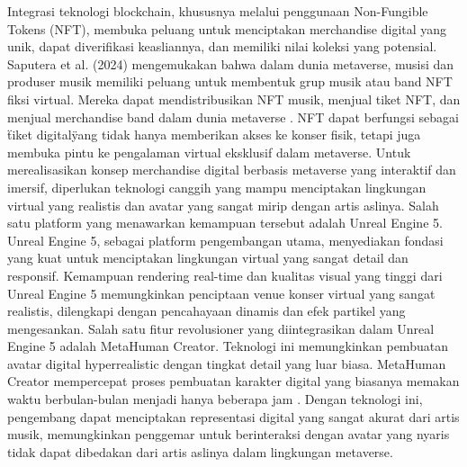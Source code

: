 Integrasi teknologi blockchain, khususnya melalui penggunaan Non-Fungible Tokens (NFT), membuka peluang untuk menciptakan 
merchandise digital yang unik, dapat diverifikasi keasliannya, dan memiliki nilai koleksi yang potensial. Saputera et al.
(2024) mengemukakan bahwa dalam dunia metaverse, musisi dan produser musik memiliki peluang untuk membentuk grup musik 
atau band NFT fiksi virtual. Mereka dapat mendistribusikan NFT musik, menjual tiket NFT, dan menjual merchandise band 
dalam dunia metaverse \parencite{EpicGames2022}. NFT dapat berfungsi sebagai \"tiket digital\" yang tidak hanya memberikan akses ke konser fisik,
tetapi juga membuka pintu ke pengalaman virtual eksklusif dalam metaverse. Untuk merealisasikan konsep merchandise digital
berbasis metaverse yang interaktif dan imersif, diperlukan teknologi canggih yang mampu menciptakan lingkungan virtual 
yang realistis dan avatar yang sangat mirip dengan artis aslinya. Salah satu platform yang menawarkan kemampuan tersebut
adalah Unreal Engine 5.
\\

Unreal Engine 5, sebagai platform pengembangan utama, menyediakan fondasi yang kuat untuk menciptakan lingkungan
virtual yang sangat detail dan responsif. Kemampuan rendering real-time dan kualitas visual yang tinggi
dari Unreal Engine 5 memungkinkan penciptaan venue konser virtual yang sangat realistis, dilengkapi dengan
pencahayaan dinamis dan efek partikel yang mengesankan. Salah satu fitur revolusioner yang diintegrasikan
dalam Unreal Engine 5 adalah MetaHuman Creator. Teknologi ini memungkinkan pembuatan avatar digital
hyperrealistic dengan tingkat detail yang luar biasa. MetaHuman Creator mempercepat proses pembuatan
karakter digital yang biasanya memakan waktu berbulan-bulan menjadi hanya beberapa jam \parencite{EpicGames2021}. Dengan
teknologi ini, pengembang dapat menciptakan representasi digital yang sangat akurat dari artis musik,
memungkinkan penggemar untuk berinteraksi dengan avatar yang nyaris tidak dapat dibedakan dari artis aslinya
dalam lingkungan metaverse.
\\

